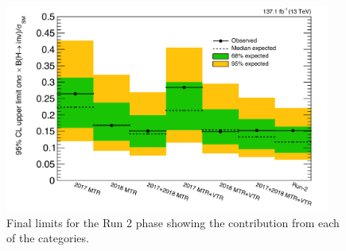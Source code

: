 \begin{figure}[htbp]
  \centering
    \includegraphics[width= 0.95\textwidth]{Results/limit_unblinded.pdf}
  \caption{Final limits for the Run 2 phase showing the contribution from each of the categories.}
  \label{fig:combined_limit}
\end{figure}